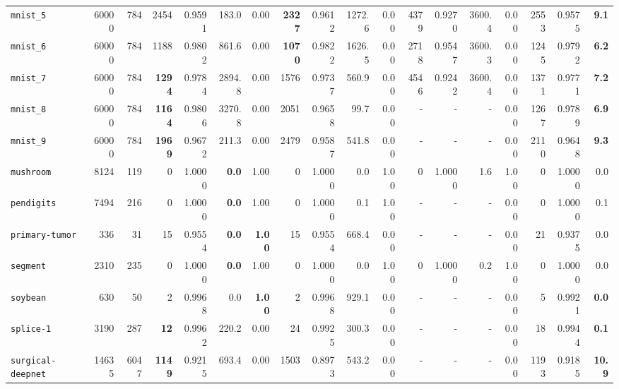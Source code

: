 \begin{tabular}{lccrrrrrrrrrrrrrrr}
\texttt{mnist\_5} & \multicolumn{1}{r}{60000} & \multicolumn{1}{r}{784}  & 2454 & 0.9591 & 183.0 & 0.00 & \textbf{2327} & 0.9612 & 1272.6 & 0.00 & 4379 & 0.9270 & 3600.4 & 0.00 & 2553 & 0.9575 & \textbf{9.1}\\
\texttt{mnist\_6} & \multicolumn{1}{r}{60000} & \multicolumn{1}{r}{784}  & 1188 & 0.9802 & 861.6 & 0.00 & \textbf{1070} & 0.9822 & 1626.5 & 0.00 & 2718 & 0.9547 & 3600.3 & 0.00 & 1245 & 0.9792 & \textbf{6.2}\\
\texttt{mnist\_7} & \multicolumn{1}{r}{60000} & \multicolumn{1}{r}{784}  & \textbf{1294} & 0.9784 & 2894.8 & 0.00 & 1576 & 0.9737 & 560.9 & 0.00 & 4546 & 0.9242 & 3600.4 & 0.00 & 1371 & 0.9771 & \textbf{7.2}\\
\texttt{mnist\_8} & \multicolumn{1}{r}{60000} & \multicolumn{1}{r}{784}  & \textbf{1164} & 0.9806 & 3270.8 & 0.00 & 2051 & 0.9658 & 99.7 & 0.00 & - & - & - & 0.00 & 1267 & 0.9789 & \textbf{6.9}\\
\texttt{mnist\_9} & \multicolumn{1}{r}{60000} & \multicolumn{1}{r}{784}  & \textbf{1969} & 0.9672 & 211.3 & 0.00 & 2479 & 0.9587 & 541.8 & 0.00 & - & - & - & 0.00 & 2110 & 0.9648 & \textbf{9.3}\\
\texttt{mushroom} & \multicolumn{1}{r}{8124} & \multicolumn{1}{r}{119}  & 0 & 1.0000 & \textbf{0.0} & 1.00 & 0 & 1.0000 & 0.0 & 1.00 & 0 & 1.0000 & 1.6 & 1.00 & 0 & 1.0000 & 0.0\\
\texttt{pendigits} & \multicolumn{1}{r}{7494} & \multicolumn{1}{r}{216}  & 0 & 1.0000 & \textbf{0.0} & 1.00 & 0 & 1.0000 & 0.1 & 1.00 & - & - & - & 0.00 & 0 & 1.0000 & 0.1\\
\texttt{primary-tumor} & \multicolumn{1}{r}{336} & \multicolumn{1}{r}{31}  & 15 & 0.9554 & \textbf{0.0} & \textbf{1.00} & 15 & 0.9554 & 668.4 & 0.00 & - & - & - & 0.00 & 21 & 0.9375 & 0.0\\
\texttt{segment} & \multicolumn{1}{r}{2310} & \multicolumn{1}{r}{235}  & 0 & 1.0000 & \textbf{0.0} & 1.00 & 0 & 1.0000 & 0.0 & 1.00 & 0 & 1.0000 & 0.2 & 1.00 & 0 & 1.0000 & 0.0\\
\texttt{soybean} & \multicolumn{1}{r}{630} & \multicolumn{1}{r}{50}  & 2 & 0.9968 & 0.0 & \textbf{1.00} & 2 & 0.9968 & 929.1 & 0.00 & - & - & - & 0.00 & 5 & 0.9921 & \textbf{0.0}\\
\texttt{splice-1} & \multicolumn{1}{r}{3190} & \multicolumn{1}{r}{287}  & \textbf{12} & 0.9962 & 220.2 & 0.00 & 24 & 0.9925 & 300.3 & 0.00 & - & - & - & 0.00 & 18 & 0.9944 & \textbf{0.1}\\
\texttt{surgical-deepnet} & \multicolumn{1}{r}{14635} & \multicolumn{1}{r}{6047}  & \textbf{1149} & 0.9215 & 693.4 & 0.00 & 1503 & 0.8973 & 543.2 & 0.00 & - & - & - & 0.00 & 1193 & 0.9185 & \textbf{10.9}\\

\end{tabular}
